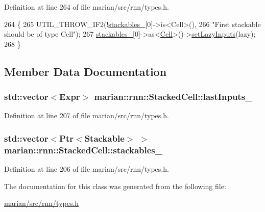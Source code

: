 Definition at line 264 of file marian/src/rnn/types.\+h.


\begin{DoxyCode}
264                                                                              \{
265     UTIL\_THROW\_IF2(!\hyperlink{classmarian_1_1rnn_1_1StackedCell_a2090a845dec5524614bd6a5fed2547ae}{stackables\_}[0]->is<Cell>(),
266                    \textcolor{stringliteral}{"First stackable should be of type Cell"});
267     \hyperlink{classmarian_1_1rnn_1_1StackedCell_a2090a845dec5524614bd6a5fed2547ae}{stackables\_}[0]->as<\hyperlink{classmarian_1_1rnn_1_1Cell_acc392c8adfb002c17993f02e6d3085a6}{Cell}>()->\hyperlink{classmarian_1_1rnn_1_1StackedCell_a87a4b17016e0d60ff14ed81f806dfd6d}{setLazyInputs}(lazy);
268   \}
\end{DoxyCode}


\subsection{Member Data Documentation}
\subsubsection[{\texorpdfstring{last\+Inputs\+\_\+}{lastInputs_}}]{\setlength{\rightskip}{0pt plus 5cm}std\+::vector$<${\bf Expr}$>$ marian\+::rnn\+::\+Stacked\+Cell\+::last\+Inputs\+\_\+\hspace{0.3cm}{\ttfamily [protected]}}\hypertarget{classmarian_1_1rnn_1_1StackedCell_a704bc0ff5bf93ff84c5fca6c14f76a71}{}\label{classmarian_1_1rnn_1_1StackedCell_a704bc0ff5bf93ff84c5fca6c14f76a71}


Definition at line 207 of file marian/src/rnn/types.\+h.

\subsubsection[{\texorpdfstring{stackables\+\_\+}{stackables_}}]{\setlength{\rightskip}{0pt plus 5cm}std\+::vector$<${\bf Ptr}$<${\bf Stackable}$>$ $>$ marian\+::rnn\+::\+Stacked\+Cell\+::stackables\+\_\+\hspace{0.3cm}{\ttfamily [protected]}}\hypertarget{classmarian_1_1rnn_1_1StackedCell_a2090a845dec5524614bd6a5fed2547ae}{}\label{classmarian_1_1rnn_1_1StackedCell_a2090a845dec5524614bd6a5fed2547ae}


Definition at line 206 of file marian/src/rnn/types.\+h.



The documentation for this class was generated from the following file\+:\begin{DoxyCompactItemize}
\item 
\hyperlink{marian_2src_2rnn_2types_8h}{marian/src/rnn/types.\+h}\end{DoxyCompactItemize}
